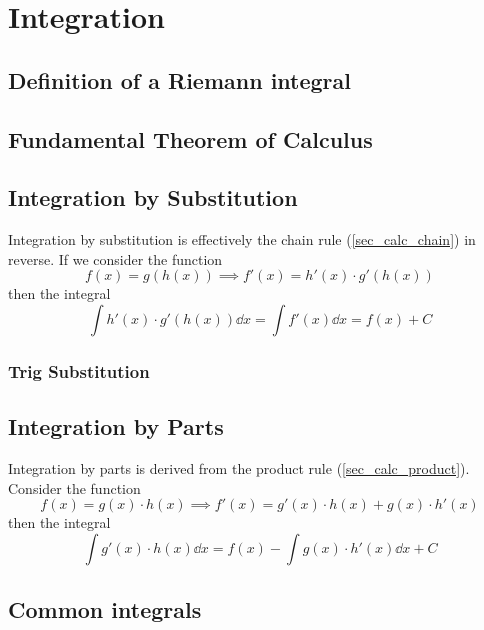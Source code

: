 \section{Integration}

\subsection{Definition of a Riemann integral}

\subsection{Fundamental Theorem of Calculus} \label{sec_calc_FTC}

\subsection{Integration by Substitution} \label{sec_calc_substitution}

Integration by substitution is effectively the chain rule
(\ref{sec_calc_chain}) in reverse. If we consider the function
\begin{equation*}
f(x) = g(h(x)) \implies f'(x) = h'(x) \cdot g'(h(x))
\end{equation*}
then the integral
\begin{equation}
\int h'(x) \cdot g'(h(x)) \dd{x} = \int f'(x) \dd{x} = f(x) + C
\end{equation}

\subsubsection{Trig Substitution} \label{sec_calc_trig_substitution}

\subsection{Integration by Parts}

Integration by parts is derived from the product rule
(\ref{sec_calc_product}).  Consider the function
\begin{equation*}
f(x) = g(x) \cdot h(x) \implies f'(x) = g'(x) \cdot h(x) + g(x) \cdot h'(x)
\end{equation*}
then the integral
\begin{equation}
\int g'(x) \cdot h(x) \dd{x} = f(x) - \int g(x) \cdot h'(x) \dd{x} + C
\end{equation}


\subsection{Common integrals}

